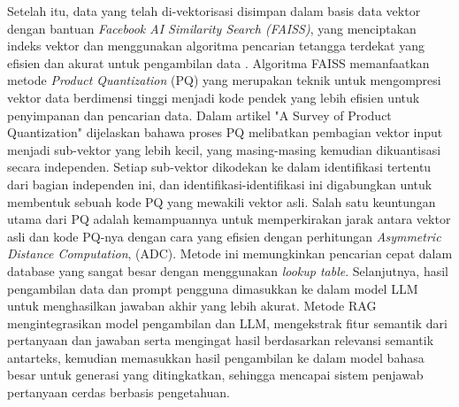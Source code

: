 Setelah itu, data yang telah di-vektorisasi disimpan dalam basis data vektor dengan bantuan  \emph{Facebook AI Similarity Search (FAISS)}, yang menciptakan indeks vektor dan menggunakan algoritma pencarian tetangga terdekat yang efisien dan akurat untuk pengambilan data \cite{10039758}. Algoritma FAISS memanfaatkan metode \emph{Product Quantization} (PQ) yang merupakan teknik untuk mengompresi vektor data berdimensi tinggi menjadi kode pendek yang lebih efisien untuk penyimpanan dan pencarian data. Dalam artikel "A Survey of Product Quantization" dijelaskan bahawa proses PQ melibatkan pembagian vektor input menjadi sub-vektor yang lebih kecil, yang masing-masing kemudian dikuantisasi secara independen. Setiap sub-vektor dikodekan ke dalam identifikasi tertentu dari bagian independen ini, dan identifikasi-identifikasi ini digabungkan untuk membentuk sebuah kode PQ yang mewakili vektor asli. Salah satu keuntungan utama dari PQ adalah kemampuannya untuk memperkirakan jarak antara vektor asli dan kode PQ-nya dengan cara yang efisien dengan perhitungan \emph{Asymmetric Distance Computation}, (ADC). Metode ini memungkinkan pencarian cepat dalam database yang sangat besar dengan menggunakan \emph{lookup table}. Selanjutnya, hasil pengambilan data dan prompt pengguna dimasukkan ke dalam model LLM untuk menghasilkan jawaban akhir yang lebih akurat. Metode RAG mengintegrasikan model pengambilan dan LLM, mengekstrak fitur semantik dari pertanyaan dan jawaban serta mengingat hasil berdasarkan relevansi semantik antarteks, kemudian memasukkan hasil pengambilan ke dalam model bahasa besar untuk generasi yang ditingkatkan, sehingga mencapai sistem penjawab pertanyaan cerdas berbasis pengetahuan. 






